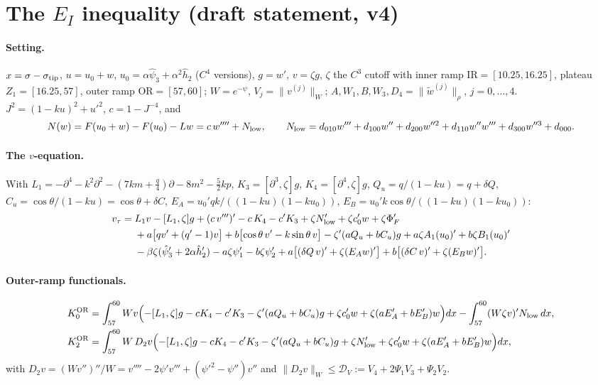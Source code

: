 \documentclass[11pt]{article}
\newcommand{\nW}[1]{\|#1\|_W}
\newcommand{\Dv}{\mathcal D_V}
\begin{document}
\section*{The $E_I$ inequality (draft statement, v4)}

\paragraph{Setting.} $x=\sigma-\sigma_{\rm tip}$, $u=u_0+w$, $u_0=\alpha\hat\psi_3+\alpha^2\hat h_2$ ($C^4$ versions), $g=w'$, $v=\zeta g$,
$\zeta$ the $C^3$ cutoff with inner ramp $\mathrm{IR}=[10.25,16.25]$, plateau $Z_1=[16.25,57]$, outer ramp $\mathrm{OR}=[57,60]$;
$W=e^{-\psi}$, $V_j=\nW{v^{(j)}}$; $A,W_1,B,W_3,D_4=\|\tilde w^{(j)}\|_\rho$, $j=0,\dots,4$.
$J^2=(1-ku)^2+u'^2$, $c=1-J^{-4}$, and
\[
N(w)=F(u_0+w)-F(u_0)-Lw=c\,w''''+N_{\rm low},\qquad
N_{\rm low}=d_{010}w'''+d_{100}w''+d_{200}w''^2+d_{110}w''w'''+d_{300}w''^3+d_{000}.
\]

\paragraph{The $v$-equation.} With $L_1=-\partial^4-k^2\partial^2-(7km+\tfrac q4)\partial-8m^2-\tfrac52kp$,
$K_3=[\partial^3,\zeta]g$, $K_4=[\partial^4,\zeta]g$, $Q_u=q/(1-ku)=q+\delta Q$, $C_u=\cos\theta/(1-ku)=\cos\theta+\delta C$,
$E_A=u_0'qk/((1-ku)(1-ku_0))$, $E_B=u_0'k\cos\theta/((1-ku)(1-ku_0))$:
\begin{align*}
v_\tau={}&L_1v-[L_1,\zeta]g+(c\,v''')'-c\,K_4-c'K_3+\zeta N_{\rm low}'+\zeta c_0'w+\zeta\Phi_F'\\
&+a\bigl[qv'+(q'-1)v\bigr]+b\bigl[\cos\theta\,v'-k\sin\theta\,v\bigr]-\zeta'(aQ_u+bC_u)g
+a\zeta A_1(u_0)'+b\zeta B_1(u_0)'\\
&-\beta\zeta(\hat\psi_3'+2\alpha\hat h_2')-a\zeta\psi_1'-b\zeta\psi_2'
+a\bigl[(\delta Q\,v)'+\zeta(E_Aw)'\bigr]+b\bigl[(\delta C\,v)'+\zeta(E_Bw)'\bigr].
\end{align*}

\paragraph{Outer-ramp functionals.}
\begin{align*}
K_0^{\rm OR}&=\int_{57}^{60}Wv\Bigl(-[L_1,\zeta]g-cK_4-c'K_3-\zeta'(aQ_u+bC_u)g+\zeta c_0'w+\zeta(aE_A'+bE_B')w\Bigr)dx-\int_{57}^{60}(W\zeta v)'N_{\rm low}\,dx,\\
K_2^{\rm OR}&=\int_{57}^{60}W\,D_2v\Bigl(-[L_1,\zeta]g-cK_4-c'K_3-\zeta'(aQ_u+bC_u)g+\zeta N_{\rm low}'+\zeta c_0'w+\zeta(aE_A'+bE_B')w\Bigr)dx,
\end{align*}
with $D_2v=(Wv'')''/W=v''''-2\psi'v'''+(\psi'^2-\psi'')v''$ and $\nW{D_2v}\le\Dv:=V_4+2\Psi_1V_3+\Psi_2V_2$.
\end{document}
